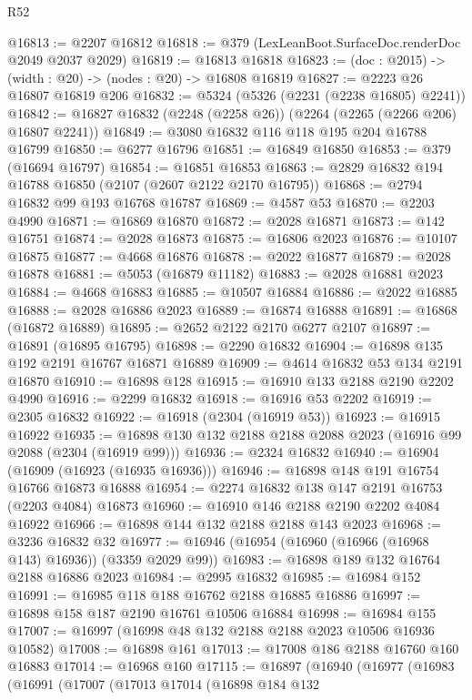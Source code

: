 \begin{lexlean}{R52}
\begin{coremodule}
@16813 := @2207 @16812
@16818 := @379 (LexLeanBoot.SurfaceDoc.renderDoc @2049 @2037 @2029)
@16819 := @16813 @16818
@16823 := (doc : @2015) -> (width : @20) -> (nodes : @20) -> @16808 @16819
@16827 := @2223 @26 @16807 @16819 @206
@16832 := @5324 (@5326 (@2231 (@2238 @16805) @2241))
@16842 := @16827 @16832 (@2248 (@2258 @26)) (@2264 (@2265 (@2266 @206) @16807 @2241))
@16849 := @3080 @16832 @116 @118 @195 @204 @16788 @16799
@16850 := @6277 @16796
@16851 := @16849 @16850
@16853 := @379 (@16694 @16797)
@16854 := @16851 @16853
@16863 := @2829 @16832 @194 @16788 @16850 (@2107 (@2607 @2122 @2170 @16795))
@16868 := @2794 @16832 @99 @193 @16768 @16787
@16869 := @4587 @53
@16870 := @2203 @4990
@16871 := @16869 @16870
@16872 := @2028 @16871
@16873 := @142 @16751
@16874 := @2028 @16873
@16875 := @16806 @2023
@16876 := @10107 @16875
@16877 := @4668 @16876
@16878 := @2022 @16877
@16879 := @2028 @16878
@16881 := @5053 (@16879 @11182)
@16883 := @2028 @16881 @2023
@16884 := @4668 @16883
@16885 := @10507 @16884
@16886 := @2022 @16885
@16888 := @2028 @16886 @2023
@16889 := @16874 @16888
@16891 := @16868 (@16872 @16889)
@16895 := @2652 @2122 @2170 @6277 @2107
@16897 := @16891 (@16895 @16795)
@16898 := @2290 @16832
@16904 := @16898 @135 @192 @2191 @16767 @16871 @16889
@16909 := @4614 @16832 @53 @134 @2191 @16870
@16910 := @16898 @128
@16915 := @16910 @133 @2188 @2190 @2202 @4990
@16916 := @2299 @16832
@16918 := @16916 @53 @2202
@16919 := @2305 @16832
@16922 := @16918 (@2304 (@16919 @53))
@16923 := @16915 @16922
@16935 := @16898 @130 @132 @2188 @2188 @2088 @2023 (@16916 @99 @2088 (@2304 (@16919 @99)))
@16936 := @2324 @16832
@16940 := @16904 (@16909 (@16923 (@16935 @16936)))
@16946 := @16898 @148 @191 @16754 @16766 @16873 @16888
@16954 := @2274 @16832 @138 @147 @2191 @16753 (@2203 @4084) @16873
@16960 := @16910 @146 @2188 @2190 @2202 @4084 @16922
@16966 := @16898 @144 @132 @2188 @2188 @143 @2023
@16968 := @3236 @16832 @32
@16977 := @16946 (@16954 (@16960 (@16966 (@16968 @143) @16936)) (@3359 @2029 @99))
@16983 := @16898 @189 @132 @16764 @2188 @16886 @2023
@16984 := @2995 @16832
@16985 := @16984 @152
@16991 := @16985 @118 @188 @16762 @2188 @16885 @16886
@16997 := @16898 @158 @187 @2190 @16761 @10506 @16884
@16998 := @16984 @155
@17007 := @16997 (@16998 @48 @132 @2188 @2188 @2023 @10506 @16936 @10582)
@17008 := @16898 @161
@17013 := @17008 @186 @2188 @16760 @160 @16883
@17014 := @16968 @160
@17115 := @16897
    (@16940
      (@16977
        (@16983
          (@16991
            (@17007
              (@17013
                @17014
                (@16898
                  @184
                  @132

\end{coremodule}
\end{lexlean}

